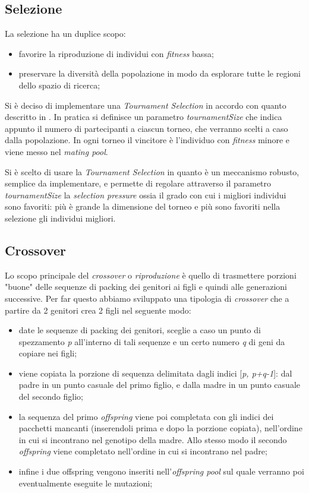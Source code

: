 \subsection{Selezione}
La selezione ha un duplice scopo:
\begin{itemize}
\item favorire la riproduzione di individui con \emph{fitness} bassa;
\item preservare la diversità della popolazione in modo da esplorare tutte le regioni dello spazio di ricerca;
\end{itemize}
Si è deciso di implementare una \emph{Tournament Selection} in accordo con quanto descritto in \cite{TournamentSelection}. In pratica si definisce un parametro \emph{tournamentSize} che indica appunto il numero di partecipanti a ciascun torneo, che verranno scelti a caso dalla popolazione. In ogni torneo il vincitore è l'individuo con \emph{fitness} minore e viene messo nel \emph{mating pool}.

Si è scelto di usare la \emph{Tournament Selection} in quanto è un meccanismo robusto, semplice da implementare, e permette di regolare attraverso il parametro \emph{tournamentSize} la \emph{selection pressure} ossia il grado con cui i migliori individui sono favoriti: più è grande la dimensione del torneo e più sono favoriti nella selezione gli individui migliori.

\subsection{Crossover}
Lo scopo principale del \emph{crossover} o \emph{riproduzione} è quello di trasmettere porzioni "buone" delle sequenze di packing dei genitori ai figli e quindi alle generazioni successive. Per far questo abbiamo sviluppato una tipologia di \emph{crossover} che a partire da 2 genitori crea 2 figli nel seguente modo:
\begin{itemize}
\item date le sequenze di packing dei genitori, sceglie a caso un punto di spezzamento \emph{p} all'interno di tali sequenze e un certo numero \emph{q} di geni da copiare nei figli;
\item viene copiata la porzione di sequenza delimitata dagli indici [\emph{p, p+q-1}]: dal padre in un punto casuale del primo figlio, e dalla madre in un punto casuale del secondo figlio;
\item la sequenza del primo \emph{offspring} viene poi completata con gli indici dei pacchetti mancanti (inserendoli prima e dopo la porzione copiata), nell'ordine in cui si incontrano nel genotipo della madre. Allo stesso modo il secondo \emph{offspring} viene completato nell'ordine in cui si incontrano nel padre;
\item infine i due offspring vengono inseriti nell'\emph{offspring pool} sul quale verranno poi eventualmente eseguite le mutazioni;
\end{itemize}

